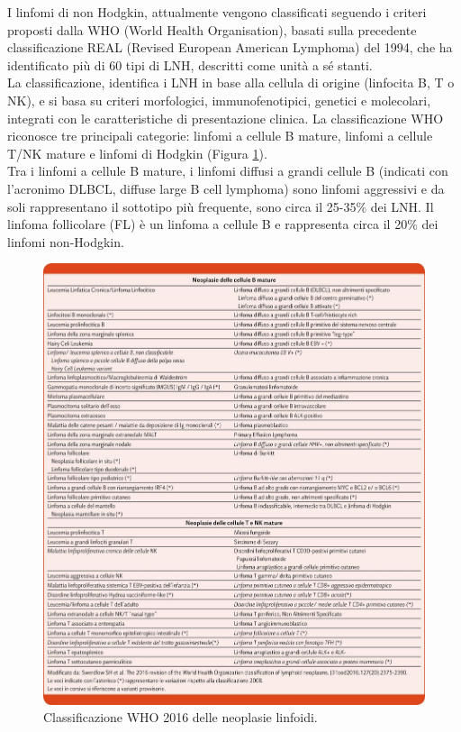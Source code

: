 I linfomi di non Hodgkin, attualmente vengono classificati seguendo i criteri proposti dalla WHO 
(World Health Organisation), basati sulla precedente classificazione REAL (Revised European American Lymphoma) 
del 1994, che ha identificato più di 60 tipi di LNH, descritti come unità a sé stanti\cite{AIOM}.\\
La classificazione, identifica i LNH in base alla cellula di origine 
(linfocita B, T o NK), e si basa su criteri morfologici, immunofenotipici, genetici e molecolari, 
integrati con le caratteristiche di presentazione clinica\cite{AIOM}. 
La classificazione WHO riconosce tre principali categorie: linfomi a cellule B mature, linfomi a cellule T/NK
mature e linfomi di Hodgkin (Figura \ref{fig:FIGURE_2.13}).\\
Tra i linfomi a cellule B mature, i linfomi diffusi a grandi cellule B (indicati con l’acronimo DLBCL, 
diffuse large B cell lymphoma) sono linfomi aggressivi e da soli rappresentano il sottotipo più frequente, 
sono circa il 25-35\% dei LNH\cite{AIOM}.
Il linfoma follicolare (FL) è un linfoma a cellule B e rappresenta circa il 20\% dei linfomi non-Hodgkin.

\begin{figure}[H]
    \begin{center}
    \includegraphics[width=1.0\columnwidth]{img/CLASS.WHO.jpeg}
    \vspace{-3mm}
    \end{center}
    \caption{Classificazione WHO 2016 delle neoplasie linfoidi.
    \cite{img15-18}}
    \label{fig:FIGURE_2.13}
\end{figure}



